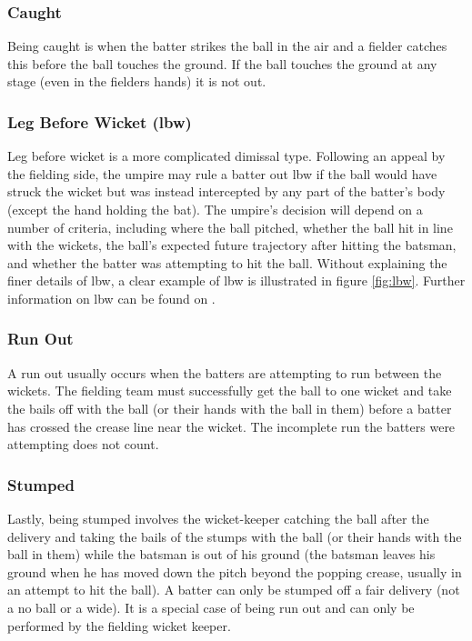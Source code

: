 \documentclass[12pt,a4paper]{report}
\theoremstyle{definition}
\begin{document}
\subsubsection{Caught}

Being caught is when the batter strikes the ball in the air and a fielder catches this before the ball touches the ground.
If the ball touches the ground at any stage (even in the fielders hands) it is not out.

\subsubsection{Leg Before Wicket (lbw)}

Leg before wicket is a more complicated dimissal type.
Following an appeal by the fielding side, the umpire may rule a batter out lbw if the ball would have struck the wicket but was instead intercepted by any part of the batter's body (except the hand holding the bat). 
The umpire's decision will depend on a number of criteria, including where the ball pitched, whether the ball hit in line with the wickets, the ball's expected future trajectory after hitting the batsman, and whether the batter was attempting to hit the ball.
Without explaining the finer details of lbw, a clear example of lbw is illustrated in figure \ref{fig:lbw}. 
Further information on lbw can be found on \citet{lbwWiki}.

\subsubsection{Run Out}

A run out usually occurs when the batters are attempting to run between the wickets.
The fielding team must successfully get the ball to one wicket and take the bails off with the ball (or their hands with the ball in them) before a batter has crossed the crease line near the wicket. 
The incomplete run the batters were attempting does not count.

\subsubsection{Stumped}

Lastly, being stumped involves the wicket-keeper catching the ball after the delivery and taking the bails of the stumps with the ball (or their hands with the ball in them) while the batsman is out of his ground (the batsman leaves his ground when he has moved down the pitch beyond the popping crease, usually in an attempt to hit the ball).
A batter can only be stumped off a fair delivery (not a no ball or a wide).
It is a special case of being run out and can only be performed by the fielding wicket keeper.
\end{document}
